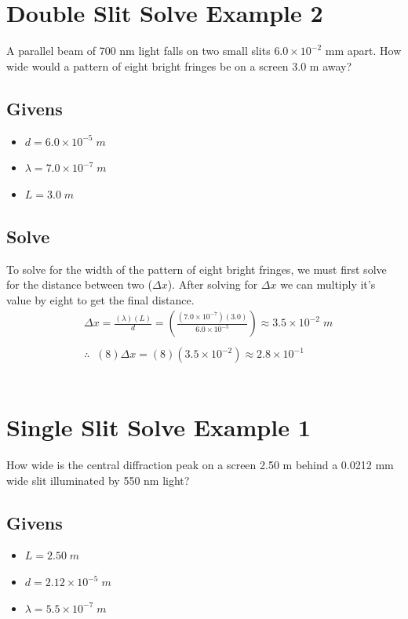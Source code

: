 \documentclass{article}
\begin{document}
\vspace{3cm}

\section{Double Slit Solve Example 2}
A parallel beam of 700 nm light falls on two small slits $6.0 \times 10^{-2}$ mm apart. How wide would a pattern of eight bright fringes be on a screen 3.0 m away?
\subsection*{Givens}
\begin{itemize}
    \item $d = 6.0 \times 10^{-5}\;m$
    \item $\lambda = 7.0 \times 10^{-7}\;m$
    \item $L = 3.0\;m$
\end{itemize}\leavevmode
\subsection*{Solve}
To solve for the width of the pattern of eight bright fringes, we must first solve for the distance between two ($\Delta x$). After solving for $\Delta x$ we can multiply it's value by eight to get the final distance.\\
\begin{align*}
     & \Delta x = \frac{(\lambda)(L)}{d} = \left(\frac{(7.0 \times 10^{-7})(3.0)}{6.0 \times 10^{-5}}\right) \approx 3.5 \times 10^{-2}\;m \\\\
     & \therefore\;\;(8)\Delta x = (8)(3.5 \times 10^{-2}) \approx 2.8 \times 10^{-1}
\end{align*}\leavevmode\\

\section{Single Slit Solve Example 1}
How wide is the central diffraction peak on a screen 2.50 m behind a 0.0212 mm wide slit illuminated by 550 nm light?
\subsection*{Givens}
\begin{itemize}
    \item $L = 2.50\;m$
    \item $d = 2.12 \times 10^{-5}\;m$
    \item $\lambda = 5.5 \times 10^{-7}\;m$
\end{itemize}\leavevmode
\end{document}
